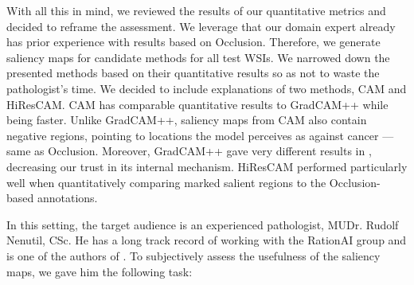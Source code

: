 With all this in mind, we reviewed the results of our quantitative metrics and decided to reframe the assessment.
We leverage that our domain expert already has prior experience with results based on Occlusion.
Therefore, we generate saliency maps for candidate methods for all test WSIs.
We narrowed down the presented methods based on their quantitative results so as not to waste the pathologist's time.
We decided to include explanations of two methods, CAM and HiResCAM.
CAM has comparable quantitative results to GradCAM++ while being faster.
Unlike GradCAM++, saliency maps from CAM also contain negative regions, pointing to locations the model perceives as against cancer --- same as Occlusion.
Moreover, GradCAM++ gave very different results in , decreasing our trust in its internal mechanism.
HiResCAM performed particularly well when quantitatively comparing marked salient regions to the Occlusion-based annotations.

In this setting, the target audience is an experienced pathologist, MUDr. Rudolf Nenutil, CSc.
He has a long track record of working with the RationAI group and is one of the authors of \cite{gallo}.
To subjectively assess the usefulness of the saliency maps, we gave him the following task:

